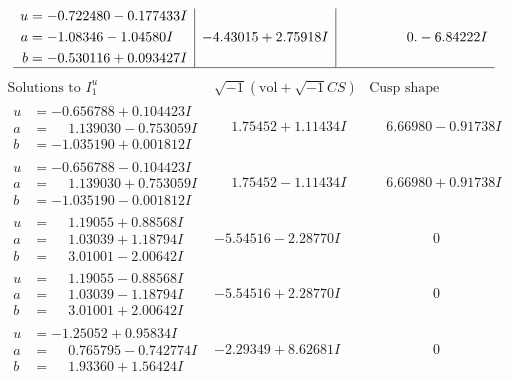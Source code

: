 \documentclass[1p]{elsarticle_modified}
\theoremstyle{definition}
\newcommand{\I}{\sqrt{-1}}
\begin{document}
$$\begin{array}{c|c|c}
\begin{aligned}
u &= -0.722480 - 0.177433 I \\
a &= -1.08346 - 1.04580 I \\
b &= -0.530116 + 0.093427 I\end{aligned}
 & -4.43015 + 2.75918 I & \phantom{-0.000000 } 0. - 6.84222 I\\
 \hline 
 \end{array}$$\newpage$$\begin{array}{c|c|c}  
\text{Solutions to }I^u_{1}& \I (\text{vol} + \sqrt{-1}CS) & \text{Cusp shape}\\
 \hline 
\begin{aligned}
u &= -0.656788 + 0.104423 I \\
a &= \phantom{-}1.139030 - 0.753059 I \\
b &= -1.035190 + 0.001812 I\end{aligned}
 & \phantom{-}1.75452 + 1.11434 I & \phantom{-}6.66980 - 0.91738 I \\ \hline\begin{aligned}
u &= -0.656788 - 0.104423 I \\
a &= \phantom{-}1.139030 + 0.753059 I \\
b &= -1.035190 - 0.001812 I\end{aligned}
 & \phantom{-}1.75452 - 1.11434 I & \phantom{-}6.66980 + 0.91738 I \\ \hline\begin{aligned}
u &= \phantom{-}1.19055 + 0.88568 I \\
a &= \phantom{-}1.03039 + 1.18794 I \\
b &= \phantom{-}3.01001 - 2.00642 I\end{aligned}
 & -5.54516 - 2.28770 I & \phantom{-0.000000 } 0 \\ \hline\begin{aligned}
u &= \phantom{-}1.19055 - 0.88568 I \\
a &= \phantom{-}1.03039 - 1.18794 I \\
b &= \phantom{-}3.01001 + 2.00642 I\end{aligned}
 & -5.54516 + 2.28770 I & \phantom{-0.000000 } 0 \\ \hline\begin{aligned}
u &= -1.25052 + 0.95834 I \\
a &= \phantom{-}0.765795 - 0.742774 I \\
b &= \phantom{-}1.93360 + 1.56424 I\end{aligned}
 & -2.29349 + 8.62681 I & \phantom{-0.000000 } 0 \\ \hline\begin{aligned}

\end{aligned}
\end{array}$$
\end{document}
